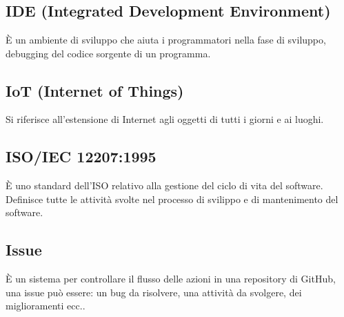 \section{}
\subsection*{IDE (Integrated Development Environment)} È un ambiente di sviluppo che aiuta i programmatori nella fase di sviluppo, debugging del codice sorgente di un programma.

\subsection*{IoT (Internet of Things)} Si riferisce all'estensione di Internet agli oggetti di tutti i giorni e ai luoghi.

\subsection*{ISO/IEC 12207:1995} È uno standard dell'ISO relativo alla gestione del ciclo di vita del software. Definisce tutte le attività svolte nel processo di svilippo e di mantenimento del software.

\subsection*{Issue} È un sistema per controllare il flusso delle azioni in una repository di GitHub, una issue può essere: un bug da risolvere, una attività da svolgere, dei miglioramenti ecc..
